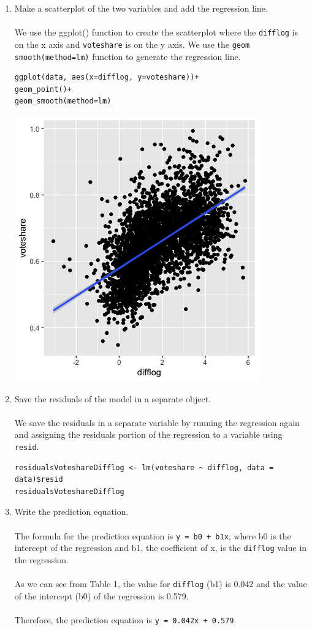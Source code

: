 \documentclass[12pt,letterpaper]{article}
\begin{document}
\begin{enumerate}
\item Make a scatterplot of the two variables and add the regression line. 
\\\\
\noindent We use the ggplot() function to create the scatterplot where the \texttt{difflog} is on the x axis and \texttt{voteshare} is on the y axis. We use the \texttt{geom smooth(method=lm)} function to generate the regression line.
\begin{lstlisting}
ggplot(data, aes(x=difflog, y=voteshare))+
geom_point()+
geom_smooth(method=lm)
\end{lstlisting}
\includegraphics{Scatterplot Difflog Voteshare.png}
\newpage
\item Save the residuals of the model in a separate object.	
\\\\
\noindent We save the residuals in a separate variable by running the regression again and assigning the residuals portion of the regression to a variable using \texttt{resid}.
\begin{lstlisting}
residualsVoteshareDifflog <- lm(voteshare ~ difflog, data = data)$resid
residualsVoteshareDifflog
\end{lstlisting}

\item Write the prediction equation.
\\\\
\noindent The formula for the prediction equation is \texttt{y = b0 + b1x}, where b0 is the intercept of the regression and b1, the coefficient of x, is the \texttt{difflog} value in the regression.
\\\\
\noindent As we can see from Table 1, the value for \texttt{difflog} (b1) is 0.042 and the value of the intercept (b0) of the regression is 0.579.
\\\\
\noindent Therefore, the prediction equation is \texttt{y = 0.042x + 0.579}.


\end{enumerate}
\end{document}
